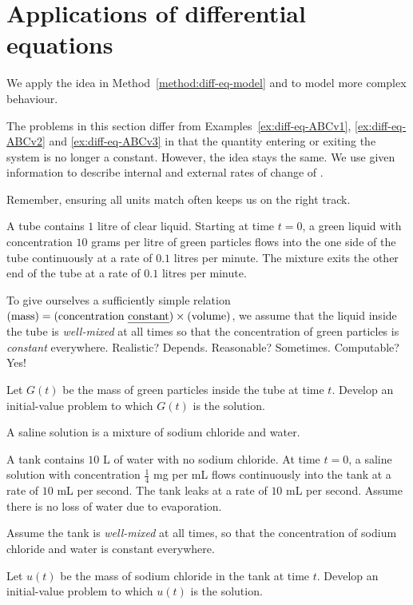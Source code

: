 \documentclass[../main.tex]{subfiles}
\begin{document}
 \section{Applications of differential equations}
We apply the idea in Method~\ref{method:diff-eq-model} and to model more complex behaviour. 

The problems in this section differ from Examples~\ref{ex:diff-eq-ABCv1}, \ref{ex:diff-eq-ABCv2} and \ref{ex:diff-eq-ABCv3} in that the quantity entering or exiting the system is no longer a constant. However, the idea stays the same. We use given information to describe internal and external rates of change of .

\faStar{} Remember, ensuring all units match often keeps us on the right track.

\begin{example}
  A tube contains \(1\) litre of clear liquid. Starting at time \(t = 0\), a green liquid with concentration \(10\) grams per litre of green particles flows into the one side of the tube continuously at a rate of \(0.1\) litres per minute.  The mixture exits the other end of the tube at a rate of \(0.1\) litres per minute.

  To give ourselves a sufficiently simple relation \((\text{mass}) = (\text{concentration \emph{constant}}) \times (\text{volume})\), we assume that the liquid inside the tube is \emph{well-mixed} at all times so that the concentration of green particles is \emph{constant} everywhere. Realistic? Depends. Reasonable? Sometimes. Computable? Yes!

  Let \(G(t)\) be the mass of green particles inside the tube at time \(t\). Develop an initial-value problem to which \(G(t)\) is the solution.
  
\end{example}
\clearpage

\begin{example} \label{ex:diff-eq-model-mixing-1}
  A saline solution is a mixture of sodium chloride and water. 

  A tank contains \(10\) L of water with no sodium chloride. At time \(t = 0\), a saline solution with concentration \(\tfrac{1}{4}\) mg per mL flows continuously into the tank at a rate of \(10\) mL per second. The tank leaks at a rate of \(10\) mL per second. Assume there is no loss of water due to evaporation.

  Assume the tank is \emph{well-mixed} at all times, so that the concentration of sodium chloride and water is constant everywhere. 

  Let \(u(t)\) be the mass of sodium chloride in the tank at time \(t\).  Develop an initial-value problem to which \(u(t)\) is the solution. 

\end{example}
\clearpage
\end{document}
